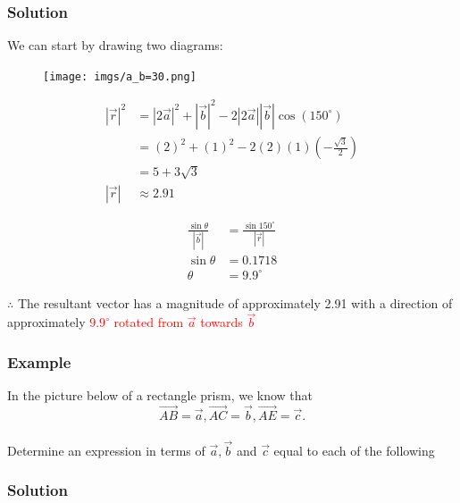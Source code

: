 \documentclass{article}
\begin{document}
\subsubsection*{Solution}
We can start by drawing two diagrams:



\begin{figure}[h]
    \centering
    \texttt{[image: imgs/a\_b=30.png]}
\end{figure}
\begin{minipage}{0.45\textwidth}
    \begin{align*}
        |\vec{r}|^2 &=|2\vec{a}|^2+|\vec{b}|^2-2|2\vec{a}||\vec{b}| \cos(150^\circ) \\
                    &=(2)^2+(1)^2-2(2)(1)\left(-\frac{\sqrt{3}}{2}\right) \\
                    &=5+3\sqrt{3} \\
        |\vec{r}|&\approx 2.91
    \end{align*}
\end{minipage}
\begin{minipage}{0.45\textwidth}
    \begin{align*}
        \frac{\sin \theta}{|\vec{b}|} &= \frac{\sin 150^\circ}{|\vec{r}|} \\
        \sin \theta &= 0.1718 \\
        \theta &= 9.9^\circ
    \end{align*}
\end{minipage}
\vspace{2em}

$\therefore$ The resultant vector has a magnitude of approximately 2.91 with a direction of approximately \textcolor{red}{$9.9^{\circ}$ rotated from $\vec{a}$ towards $\Vec{b}$}

\subsubsection*{Example}
In the picture below of a rectangle prism, we know that $$\overrightarrow{AB}= \vec{a}, \overrightarrow{AC}=\vec{b}, \overrightarrow{AE}=\vec{c}.$$\\
Determine an expression in terms of $\vec{a}, \vec{b}$ and $\vec{c}$ equal to each of the following

\subsubsection*{Solution}
\end{document}
